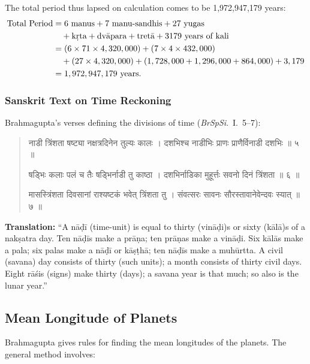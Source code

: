 \documentclass[11pt,a4paper]{article}
\newcommand{\dev}[1]{{\devanagarifont #1}}
\newenvironment{sanskritverse}{%
  \begin{quote}
  \devanagarifont
  \small
  \color{titlecolor}
}{\end{quote}}
\theoremstyle{definition}
\begin{document}
The total period thus lapsed on calculation comes to be 1,972,947,179 years:
\begin{align*}
\text{Total Period} &= 6\text{ manus} + 7\text{ manu-sandhis} + 27\text{ yugas} \\
&\quad + \text{k\d{r}ta} + \text{dv\=apara} + \text{tret\=a} + 3179\text{ years of kali} \\
&= (6 \times 71 \times 4,320,000) + (7 \times 4 \times 432,000) \\
&\quad + (27 \times 4,320,000) + (1,728,000 + 1,296,000 + 864,000) + 3,179 \\
&= 1,972,947,179\text{ years.}
\end{align*}


\subsubsection{Sanskrit Text on Time Reckoning}

Brahmagupta's verses defining the divisions of time (\textit{BrSpSi}.\ I.\ 5--7):

\begin{sanskritverse}
\dev{नाडी त्रिंशता षष्ट्या नक्षत्रदिनेन तुल्यः कालः ।}
\dev{दशभिश्च नाडीभिः प्राणः प्राणैर्विनाडी दशभिः ॥ ५ ॥}

\dev{षड्भिः कलाः पलं च तैः षड्भिर्नाडी तु काष्ठा ।}
\dev{दशभिर्नाडिका मुहूर्त्तः सवनो दिनं त्रिंशता ॥ ६ ॥}

\dev{मासस्त्रिंशता दिवसानां राश्यष्टकं भवेत् त्रिंशता तु ।}
\dev{संवत्सरः सावनः सौरस्तावानेवेन्दवः स्यात् ॥ ७ ॥}
\end{sanskritverse}

\textbf{Translation:} ``A n\=a\d{d}\=i (time-unit) is equal to thirty (vin\=a\d{d}i)s or sixty (k\=al\=a)s of a nak\d{s}atra day. Ten n\=a\d{d}\=is make a pr\=a\d{n}a; ten pr\=a\d{n}as make a vin\=a\d{d}i. Six k\=al\=as make a pala; six palas make a n\=a\d{d}\=i or k\=a\d{s}\d{t}h\=a; ten n\=a\d{d}\=is make a muh\=urtta. A civil (savana) day consists of thirty (such units); a month consists of thirty civil days. Eight r\=a\'sis (signs) make thirty (days); a savana year is that much; so also is the lunar year.''

\vspace{0.3cm}

\subsection{Mean Longitude of Planets}

Brahmagupta gives rules for finding the mean longitudes of the planets. The general method involves:
\end{document}
